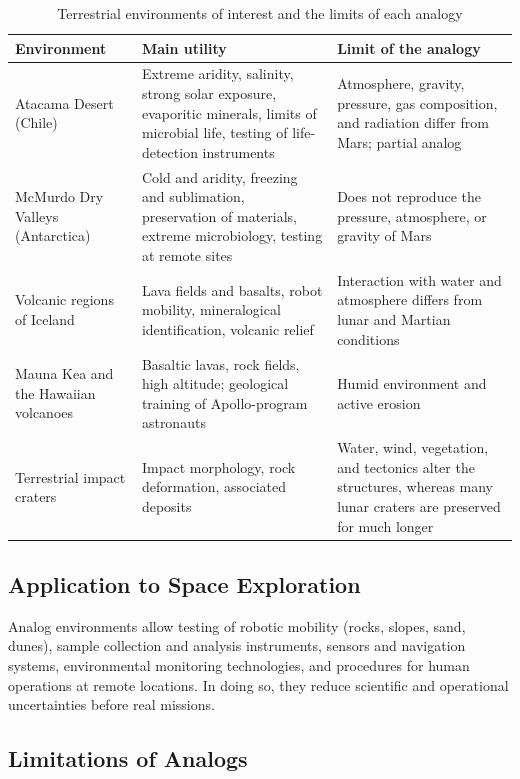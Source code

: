 \documentclass[12pt,letterpaper]{article}
\begin{document}
\begin{table}[htbp]
\centering
\caption{Terrestrial environments of interest and the limits of each analogy}
\small
\begin{tabularx}{\textwidth}{>{\raggedright\arraybackslash}p{3.2cm} >{\raggedright\arraybackslash}X >{\raggedright\arraybackslash}X}
\toprule
\textbf{Environment} & \textbf{Main utility} & \textbf{Limit of the analogy} \\
\midrule
Atacama Desert (Chile) & Extreme aridity, salinity, strong solar exposure, evaporitic minerals, limits of microbial life, testing of life-detection instruments & Atmosphere, gravity, pressure, gas composition, and radiation differ from Mars; partial analog \\
McMurdo Dry Valleys (Antarctica) & Cold and aridity, freezing and sublimation, preservation of materials, extreme microbiology, testing at remote sites & Does not reproduce the pressure, atmosphere, or gravity of Mars \\
Volcanic regions of Iceland & Lava fields and basalts, robot mobility, mineralogical identification, volcanic relief & Interaction with water and atmosphere differs from lunar and Martian conditions \\
Mauna Kea and the Hawaiian volcanoes & Basaltic lavas, rock fields, high altitude; geological training of Apollo-program astronauts & Humid environment and active erosion \\
Terrestrial impact craters & Impact morphology, rock deformation, associated deposits & Water, wind, vegetation, and tectonics alter the structures, whereas many lunar craters are preserved for much longer \\
\bottomrule
\end{tabularx}
\end{table}

\subsection{Application to Space Exploration}

Analog environments allow testing of robotic mobility (rocks, slopes, sand, dunes), sample collection and analysis instruments, sensors and navigation systems, environmental monitoring technologies, and procedures for human operations at remote locations. In doing so, they reduce scientific and operational uncertainties before real missions.

\subsection{Limitations of Analogs}
\end{document}
